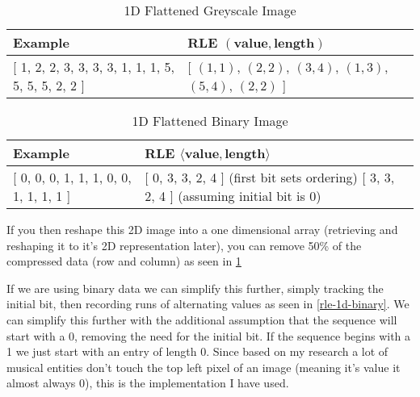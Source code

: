 \begin{table}[H]
    \begin{tabularx}{\textwidth}{ X | X }
        \toprule
        Example & RLE $(\textbf{value}, \textbf{length})$\\
        \midrule

        {[} 1, 2, 2, 3, 3, 3, 3, 1, 1, 1, 5, 5, 5, 5, 2, 2 {]}
        &
        {[} $(1, 1)$,
        $(2, 2)$,
        $(3, 4)$,
        $(1, 3)$,
        $(5, 4)$,
        $(2, 2)$ {]} \\
    \bottomrule
    \end{tabularx}

    \caption{1D Flattened Greyscale Image}
    \label{table:rle-1d}
\end{table}

\begin{table}[H]
    \begin{tabularx}{\textwidth}{ X | X }
        \toprule
        Example & RLE $\langle \textbf{value}, \textbf{length} \rangle$\\
        \midrule

        {[} 0, 0, 0, 1, 1, 1, 0, 0, 1, 1, 1, 1 {]}
        &
        {[} 0, 3, 3, 2, 4 {]} (first bit sets ordering)\newline
        {[} 3, 3, 2, 4 {]} (assuming initial bit is 0) \\
    \bottomrule
    \end{tabularx}

    \caption{1D Flattened Binary Image}
    \label{table:rle-1d-binary}
\end{table}

If you then reshape this 2D image into a one dimensional array (retrieving and reshaping it to it's 2D representation later), you can remove 50\% of the compressed data (row and column) as seen in \cref{table:rle-1d}

If we are using binary data we can simplify this further, simply tracking the initial bit, then recording runs of alternating values as seen in \cref{rle-1d-binary}. We can simplify this further with the additional assumption \parencite{fujinaga1996adaptive} that the sequence will start with a 0, removing the need for the initial bit. If the sequence begins with a 1 we just start with an entry of length 0. Since based on my research a lot of musical entities don't touch the top left pixel of an image (meaning it's value it almost always 0), this is the implementation I have used.
